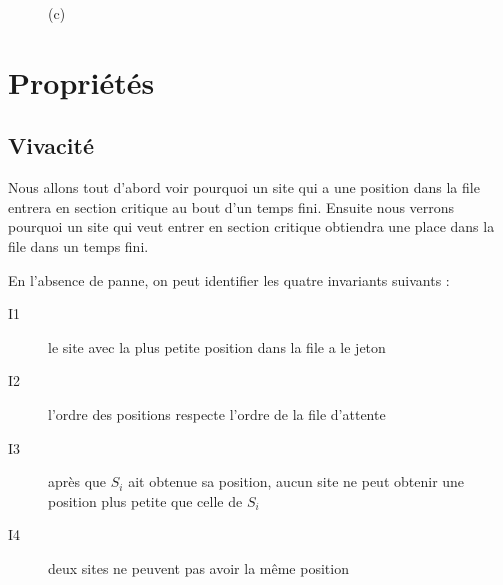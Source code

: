 \begin{figure}[H]
\centering
	\hspace{1cm}
	\caption{(c)\label{fault_tolerant_ex3}}
\end{figure}


\section{Propriétés}

\subsection{Vivacité}
Nous allons tout d'abord voir pourquoi un site qui a une position dans la file entrera en section critique au bout d'un temps fini. Ensuite nous verrons pourquoi un site qui veut entrer en section critique obtiendra une place dans la file dans un temps fini.

En l'absence de panne, on peut identifier les quatre invariants suivants :
\begin{description}
\item[I1] le site avec la plus petite position dans la file a le jeton
\item[I2] l'ordre des positions respecte l'ordre de la file d'attente
\item[I3] après que $S_i$ ait obtenue sa position, aucun site ne peut obtenir une position plus petite que celle de $S_i$
\item[I4] deux sites ne peuvent pas avoir la même position
\end{description}

